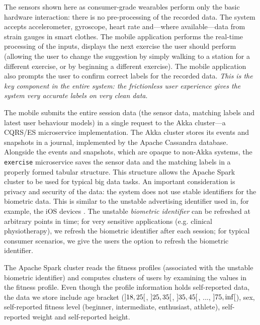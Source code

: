 \documentclass[a4paper, 10 pt, conference]{IEEEtran}
\begin{document}
The sensors shown here as consumer-grade wearables perform only the basic hardware interaction: there is no pre-processing of the recorded data. The system accepts accelerometer, gyroscope, heart rate and---where available---data from strain gauges in smart clothes. The mobile application performs the real-time processing of the inputs, displays the next exercise the user should perform (allowing the user to change the suggestion by simply walking to a station for a different exercise, or by beginning a different exercise). The mobile application also prompts the user to confirm correct labels for the recorded data. \emph{This is the key component in the entire system: the frictionless user experience gives the system very accurate labels on very clean data}.

The mobile submits the entire session data (the sensor data, matching labels and latest user behaviour models) in a single request to the Akka \cite{akka} cluster---a CQRS/ES \cite{cqrs-es} microservice implementation. The Akka cluster stores its events and snapshots in a journal, implemented by the Apache Cassandra \cite{apache-cassandra} database. Alongside the events and snapshots, which are opaque to non-Akka systems, the \texttt{exercise} microservice saves the sensor data and the matching labels in a properly formed tabular structure. This structure allows the Apache Spark \cite{apache-spark} cluster to be used for typical big data tasks. An important consideration is privacy and security of the data: the system does not use stable identifiers for the biometric data. This is similar to the unstable advertising identifier used in, for example, the iOS devices \cite{ios-advertising-identifier}. The unstable \emph{biometric identifier} can be refreshed at arbitrary points in time; for very sensitive applications (e.g. clinical physiotherapy), we refresh the biometric identifier after each session; for typical consumer scenarios, we give the users the option to refresh the biometric identifier.

The Apache Spark cluster reads the fitness profiles (associated with the unstable biometric identifier) and computes clusters of users by examining the values in the fitness profile. Even though the profile information holds self-reported data, the data we store include age bracket ($\interval[open]{18}{25}$, $\interval[open]{25}{35}$, $\interval[open]{35}{45}$, ..., $\interval[open]{75}{\inf}$), sex, self-reported fitness level (beginner, intermediate, enthusiast, athlete), self-reported weight and self-reported height.
\end{document}
